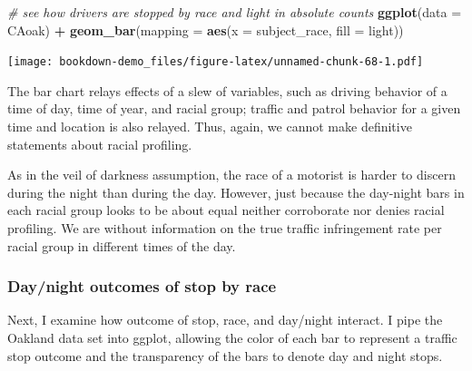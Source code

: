\documentclass[
]{book}
\newenvironment{Shaded}{\begin{snugshade}}{\end{snugshade}}
\newcommand{\CommentTok}[1]{\textcolor[rgb]{0.56,0.35,0.01}{\textit{#1}}}
\newcommand{\DataTypeTok}[1]{\textcolor[rgb]{0.13,0.29,0.53}{#1}}
\newcommand{\DecValTok}[1]{\textcolor[rgb]{0.00,0.00,0.81}{#1}}
\newcommand{\FloatTok}[1]{\textcolor[rgb]{0.00,0.00,0.81}{#1}}
\newcommand{\KeywordTok}[1]{\textcolor[rgb]{0.13,0.29,0.53}{\textbf{#1}}}
\newcommand{\NormalTok}[1]{#1}
\newcommand{\OperatorTok}[1]{\textcolor[rgb]{0.81,0.36,0.00}{\textbf{#1}}}
\newcommand{\StringTok}[1]{\textcolor[rgb]{0.31,0.60,0.02}{#1}}
\begin{document}
\begin{Shaded}
\begin{Highlighting}[]
\CommentTok{# see how drivers are stopped by race and light in absolute counts}
\KeywordTok{ggplot}\NormalTok{(}\DataTypeTok{data =}\NormalTok{ CAoak) }\OperatorTok{+}
\StringTok{  }\KeywordTok{geom_bar}\NormalTok{(}\DataTypeTok{mapping =} \KeywordTok{aes}\NormalTok{(}\DataTypeTok{x =}\NormalTok{ subject_race, }\DataTypeTok{fill =}\NormalTok{ light))}
\end{Highlighting}
\end{Shaded}

\texttt{[image: bookdown-demo\_files/figure-latex/unnamed-chunk-68-1.pdf]}

The bar chart relays effects of a slew of variables, such as driving behavior of a time of day, time of year, and racial group; traffic and patrol behavior for a given time and location is also relayed. Thus, again, we cannot make definitive statements about racial profiling.

As in the veil of darkness assumption, the race of a motorist is harder to discern during the night than during the day. However, just because the day-night bars in each racial group looks to be about equal neither corroborate nor denies racial profiling. We are without information on the true traffic infringement rate per racial group in different times of the day.

\hypertarget{daynight-outcomes-of-stop-by-race}{%
\subsubsection{Day/night outcomes of stop by race}\label{daynight-outcomes-of-stop-by-race}}

Next, I examine how outcome of stop, race, and day/night interact. I pipe the Oakland data set into ggplot, allowing the color of each bar to represent a traffic stop outcome and the transparency of the bars to denote day and night stops.

\begin{Shaded}
\end{Shaded}
\end{document}
